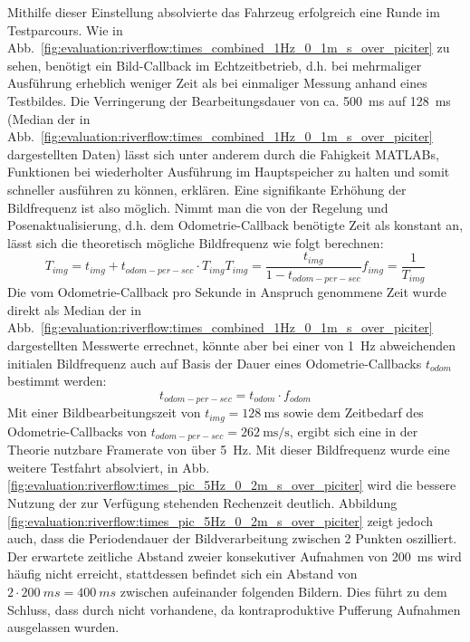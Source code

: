 Mithilfe dieser Einstellung absolvierte das Fahrzeug erfolgreich eine Runde im Testparcours. Wie in Abb.~\ref{fig:evaluation:riverflow:times_combined_1Hz_0_1m_s_over_piciter} zu sehen, benötigt ein Bild-Callback im Echtzeitbetrieb, d.h. bei mehrmaliger Ausführung erheblich weniger Zeit als bei einmaliger Messung anhand eines Testbildes. Die Verringerung der Bearbeitungsdauer  von ca. \SI{500}{\milli\second} auf \SI{128}{\milli\second} (Median der in Abb.~\ref{fig:evaluation:riverflow:times_combined_1Hz_0_1m_s_over_piciter} dargestellten Daten) lässt sich unter anderem durch die Fahigkeit MATLABs, Funktionen bei wiederholter Ausführung im Hauptspeicher zu halten und somit schneller ausführen zu können, erklären. Eine signifikante Erhöhung der Bildfrequenz  ist also möglich. Nimmt man die von der Regelung und Posenaktualisierung, d.h. dem Odometrie-Callback benötigte Zeit als konstant an, lässt sich die theoretisch mögliche Bildfrequenz wie folgt berechnen:
\begin{subequations}
\begin{equation}
	T_{img} = t_{img}+t_{odom-per-sec}\cdot T_{img}
\end{equation}
\begin{equation}
	T_{img} = \frac{t_{img}}{1-t_{odom-per-sec}}
\end{equation}
\begin{equation}	
	f_{img} = \frac{1}{T_{img}}
\end{equation}
\end{subequations} 
Die vom Odometrie-Callback pro Sekunde in Anspruch genommene Zeit  wurde direkt als Median der in Abb.~\ref{fig:evaluation:riverflow:times_combined_1Hz_0_1m_s_over_piciter} dargestellten Messwerte errechnet, könnte aber bei einer von \SI{1}{\hertz} abweichenden initialen Bildfrequenz auch auf Basis der Dauer eines Odometrie-Callbacks \(t_{odom}\) bestimmt werden: 
\begin{equation}
t_{odom-per-sec} = t_{odom} \cdot f_{odom}
\end{equation}
Mit einer Bildbearbeitungszeit von \(t_{img}=\SI{128}{\milli\second}\) sowie dem Zeitbedarf des Odometrie-Callbacks von \(t_{odom-per-sec}=\SI{262}{\milli\second\per\second}\), ergibt sich eine in der Theorie nutzbare Framerate von über \SI{5}{\hertz}. Mit dieser Bildfrequenz wurde eine weitere Testfahrt absolviert, in Abb. \ref{fig:evaluation:riverflow:times_pic_5Hz_0_2m_s_over_piciter} wird die bessere Nutzung der zur Verfügung stehenden Rechenzeit deutlich. Abbildung \ref{fig:evaluation:riverflow:times_pic_5Hz_0_2m_s_over_piciter} zeigt jedoch auch, dass die Periodendauer der Bildverarbeitung zwischen 2 Punkten oszilliert. Der erwartete zeitliche Abstand zweier konsekutiver Aufnahmen von \SI{200}{ms} wird häufig nicht erreicht, stattdessen befindet sich ein Abstand von \(2 \cdot \SI{200}{ms} = \SI{400}{ms}\) zwischen aufeinander folgenden Bildern. Dies führt zu dem Schluss, dass durch nicht vorhandene, da kontraproduktive Pufferung Aufnahmen ausgelassen wurden.

